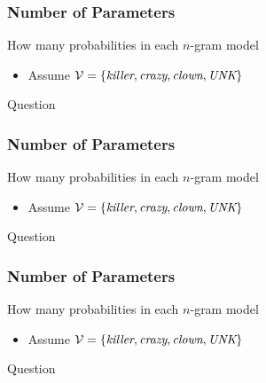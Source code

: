 \begin{frame}
\frametitle{Number of Parameters}
\begin{block}{How many probabilities in each $n$-gram model}
\begin{itemize}
\item Assume ${\cal V} = \{ \textit{killer}, \textit{crazy}, \textit{clown}, \textit{UNK} \}$
\end{itemize}
\end{block}
\pause
\begin{alertblock}{Question}
\end{alertblock}
\end{frame}

\begin{frame}
\frametitle{Number of Parameters}
\begin{block}{How many probabilities in each $n$-gram model}
\begin{itemize}
\item Assume ${\cal V} = \{ \textit{killer}, \textit{crazy}, \textit{clown}, \textit{UNK} \}$
\end{itemize}
\end{block}
\pause
\begin{alertblock}{Question}
\end{alertblock}
\end{frame}

\begin{frame}
\frametitle{Number of Parameters}
\begin{block}{How many probabilities in each $n$-gram model}
\begin{itemize}
\item Assume ${\cal V} = \{ \textit{killer}, \textit{crazy}, \textit{clown}, \textit{UNK} \}$
\end{itemize}
\end{block}
\pause
\begin{alertblock}{Question}
\end{alertblock}
\end{frame}

